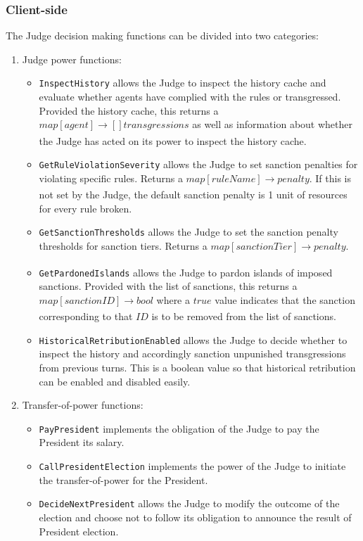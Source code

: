 \subsubsection{Client-side}
The Judge decision making functions can be divided into two categories:
\begin{enumerate}
    \item Judge power functions:
    \begin{itemize}
        \item \texttt{InspectHistory} allows the Judge to inspect the history cache and evaluate whether agents have complied with the rules or transgressed. Provided the history cache, this returns a $map[agent] \xrightarrow[]{} []transgressions$ as well as information about whether the Judge has acted on its power to inspect the history cache.
        \item \texttt{GetRuleViolationSeverity} allows the Judge to set sanction penalties for violating specific rules. Returns a $map[ruleName] \xrightarrow[]{} penalty$. If this is not set by the Judge, the default sanction penalty is 1 unit of resources for every rule broken.
        \item \texttt{GetSanctionThresholds} allows the Judge to set the sanction penalty thresholds for sanction tiers. Returns a $map[sanctionTier] \xrightarrow[]{} penalty$.
        \item \texttt{GetPardonedIslands} allows the Judge to pardon islands of imposed sanctions. Provided with the list of sanctions, this returns a $map[sanctionID] \xrightarrow[]{} bool$ where a $true$ value indicates that the sanction corresponding to that $ID$ is to be removed from the list of sanctions.
        \item \texttt{HistoricalRetributionEnabled} allows the Judge to decide whether to inspect the history and accordingly sanction unpunished transgressions from previous turns. This is a boolean value so that historical retribution can be enabled and disabled easily.
    \end{itemize}
    \item Transfer-of-power functions:
    \begin{itemize}
        \item \texttt{PayPresident} implements the obligation of the Judge to pay the President its salary. 
        \item \texttt{CallPresidentElection} implements the power of the Judge to initiate the transfer-of-power for the President.
        \item \texttt{DecideNextPresident} allows the Judge to modify the outcome of the election and choose not to follow its obligation to announce the result of President election.
    \end{itemize}
\end{enumerate}
